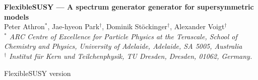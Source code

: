 \documentclass[a4paper,11pt]{article}
\begin{document}
\begin{titlepage}
  \vspace*{55mm}
  \begin{center}
    {\Large\bf FlexibleSUSY --- A spectrum generator generator for
      supersymmetric models}
    \\[8mm]
    Peter Athron$^{*}$,
    Jae-hyeon Park$^{\dagger}$,
    Dominik St\"ockinger$^{\dagger}$,
    Alexander Voigt$^{\dagger}$
    \\[3mm]
    {\small\it $^*$ ARC Centre of Excellence for Particle Physics at
      the Terascale, School of Chemistry and Physics, University of
      Adelaide, Adelaide, SA 5005, Australia
      \\[2mm]
      \small\it $^\dagger$ Institut f\"ur Kern und Teilchenphysik, TU
      Dresden, Dresden, 01062, Germany.\\[2mm]}
  \end{center}
  \vspace*{0.75cm}
  \begin{abstract}
    We present a new spectrum generator generator for supersymmetric
    models with modularity and speed in mind.
  \end{abstract}
  \vfill
  \begin{flushleft}
    FlexibleSUSY version \FlexibleSUSYVersion
  \end{flushleft}
\end{titlepage}

\tableofcontents
\clearpage




\end{document}
